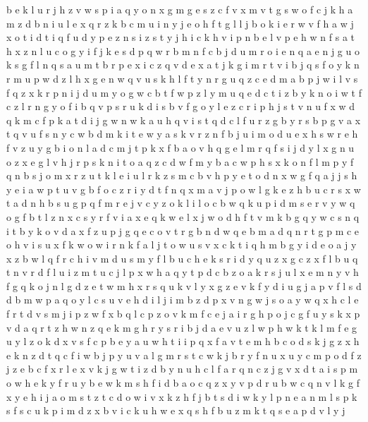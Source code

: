 \documentclass{article}
\begin{document}
b e k l u r j h z v w s p i a q y o n x g m
g e s z c f v x m
v t g s w o f c j k h a m z d b n i u l e x q r
z k b c m u i n y j e o h f t g l
l j b o k i e r w v f h
a w j x o t i
d t i
q f u d y p e z n s i
z
s t y j h i c k
h v i p n b e l
v p e h w n f s a
t h x z n l u c o g y i f j k e s d p q w r b m
n f c b j d u
m r o i e n
q a e n j g u o k s
g f l n q s a u m t b r p e x i
c z q v d e x a t j k g i m r
t v i b j q s f o y k n r m u p w d z l h x g e
n w q v u
s k h l f t y n r g u q z c e d m a b p j w i
l v s f q z x k r p n i j d u m y o g w c b t
f w p z l y m u q e d c t i
z b y k n o i w t f c
z l r n g y o f i b q v p s
r
u k d i s b v f
g o y l e z c r i p h j s t v n u f x w d q k m
c f p k a t d i j g w
n w k a u h q v i s t
q d c l f u r z g b
y r s b p g v
a x t q v u f s n y c w b d m k i
t e w y a s k v r z n f b j u i m o d
u e x h
s w r e h f v z u y g b i o n l a d c m j t p k x
f b a o v h q g e l m
r q f s i j d y l x g n u o z
x e g l v h j r p s k n i t o a q z c d w f m y b
a c w p h s x k o n f l
m
p y f q n b s j o m x r z u t k l e
i u l r k z s m c b v h p y e t o d n x w g f q a j
j s h y e i a w p t u v g b f o c z r
i y d t f n q x m a v j p o w l g k e z h b u c r s
x w t a d n h b s u g p q f m r e j v c y z o k l i
l o c b w q
k u p i d m s e r v y w q o g f b t l z n x c
s y
r f v i a x e q k w
e l x j w o d h f t v m k b g q y
w c s n q i t b y k o v d a x f z u p j g
q e c o v t r g b n
d w q e b m
a d q n r t g p m c e o h v i s u x f k w
o w i r n k f a l j t
o w u s v x c k t i q h m b g y
i d e
o a j y x z b w l q f r c h i v m d u s
m y f
l b u c h e k s r i d y
q u z x g c
z x f l b u q t
n v r d f l u i z m t
u c j l p x w h a q y
t p d c b z o a k r s j u l x e m n y v h f g q
k o j n l g d z e t w m h
x r s q u k v l y
x g z e v k f y d i
u g j a p v f l s d
d b m w p a q o y l c s u v e h
d i l j
i m b z d p x v n g w j s
o a y w q x h c l e f r t d v s m j i p z
w f x b q l c p z o v
k m f c e j a i r g h p
o j c g f u y s k x p v d a q r t z h w n
z q e k m g h r y
s r i b j d a e v u z l w
p h
w k
t k l m f e g u y
l z o k d x v s f c p b e y a u w h t i
i p q x f a v t e m h b c o d s k j g z
x h e k n z d t q c f i w b j p y u v a l g m r s
t c w k j b r y f n u x
u y c m p o d f z j
z e b c f x r l
e x v k j g w t i z d b y n u h c l f a r q
n c z j g v x d t a i s p m o w h e k y f r u
y b
e w k m s h f i d b a o c q z x y v
p d r u b w c q n v l k g f x y e h i j a o m s t z
t c d o w i v x k
z h f j b t s d i w k y l p n e a
n m l s
p k s
f s c u k p i m d z x
b v i c k u h w e x q s
h f b u z m k t q s e a p d v l y j
\end{document}
